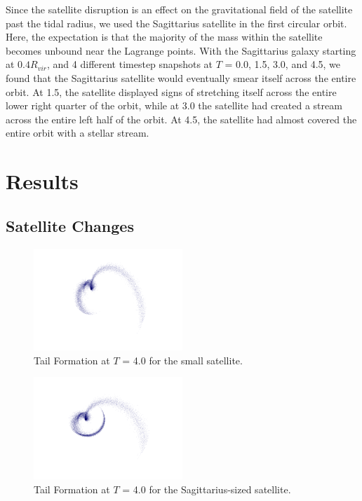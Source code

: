 \documentclass[twocolumn]{article}
\begin{document}
Since the satellite disruption is an effect on the gravitational field of the satellite past the tidal radius, we used the Sagittarius satellite in the first circular orbit. Here, the expectation is that the majority of the mass within the satellite becomes unbound near the Lagrange points. With the Sagittarius galaxy starting at $0.4R_{vir}$, and 4 different timestep snapshots at $T$ = 0.0, 1.5, 3.0, and 4.5, we found that the Sagittarius satellite would eventually smear itself across the entire orbit. At 1.5, the satellite displayed signs of stretching itself across the entire lower right quarter of the orbit, while at 3.0 the satellite had created a stream across the entire left half of the orbit. At 4.5, the satellite had almost covered the entire orbit with a stellar stream. 


\section{Results}
\subsection{Satellite Changes}
\begin{figure}
	\centering
	\includegraphics[width=0.5\textwidth]{small.png}	
	\caption{Tail Formation at $T$ = 4.0 for the small satellite. }
	\label{fig:small}
\end{figure}

\begin{figure}
	\centering
	\includegraphics[width=0.5\textwidth]{medium.png}	
	\caption{Tail Formation at $T$ = 4.0 for the Sagittarius-sized satellite. }
	\label{fig:medium}
\end{figure}
\end{document}
